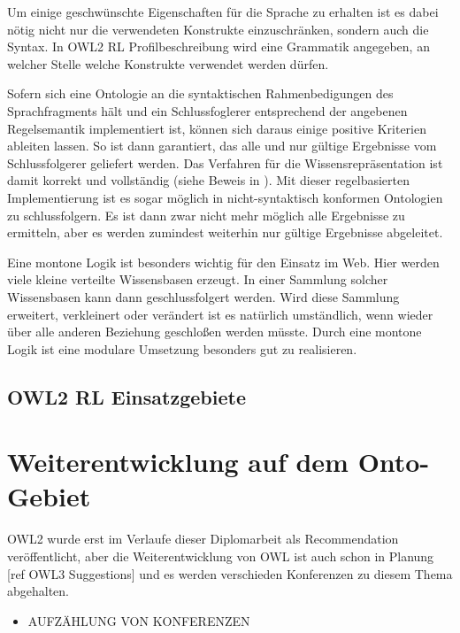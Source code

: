 Um einige geschwünschte Eigenschaften für die Sprache zu erhalten ist es dabei nötig nicht nur die verwendeten Konstrukte einzuschränken, sondern auch die Syntax. In OWL2 RL Profilbeschreibung wird eine Grammatik angegeben, an welcher Stelle welche Konstrukte verwendet werden dürfen.

Sofern sich eine Ontologie an die syntaktischen Rahmenbedigungen des Sprachfragments hält und ein Schlussfoglerer entsprechend der angebenen Regelsemantik implementiert ist, können sich daraus einige positive Kriterien ableiten lassen. So ist dann garantiert, das alle und nur gültige Ergebnisse vom Schlussfolgerer geliefert werden. Das Verfahren für die Wissensrepräsentation ist damit korrekt und vollständig (siehe Beweis in \cite{OWL2Profiles}).
Mit dieser regelbasierten Implementierung ist es sogar möglich in nicht-syntaktisch konformen Ontologien zu schlussfolgern. Es ist dann zwar nicht mehr möglich alle Ergebnisse zu ermitteln, aber es werden zumindest weiterhin nur gültige Ergebnisse abgeleitet.

Eine montone Logik ist besonders wichtig für den Einsatz im Web. Hier werden viele kleine verteilte Wissensbasen erzeugt. In einer Sammlung solcher Wissensbasen kann dann geschlussfolgert werden. Wird diese Sammlung erweitert, verkleinert oder verändert ist es natürlich umständlich, wenn wieder über alle anderen Beziehung geschloßen werden müsste. Durch eine montone Logik ist eine modulare Umsetzung besonders gut zu realisieren.

\subsection{OWL2 RL Einsatzgebiete}


\section{Weiterentwicklung auf dem Onto-Gebiet}

OWL2 wurde erst im Verlaufe dieser Diplomarbeit als Recommendation veröffentlicht, aber die Weiterentwicklung von OWL ist auch schon in Planung [ref OWL3 Suggestions] und es werden verschieden Konferenzen zu diesem Thema abgehalten.
\begin{itemize}
  \item AUFZÄHLUNG VON KONFERENZEN
\end{itemize}
